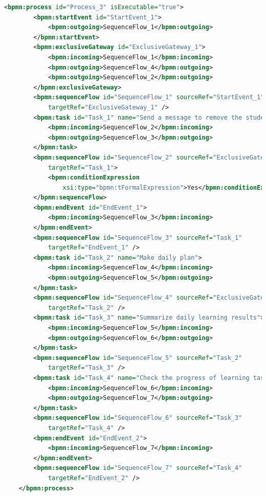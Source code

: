 \documentclass[runningheads]{llncs}
\begin{document}
	\begin{lstlisting}[language={XML}]
	<bpmn:process id="Process_3" isExecutable="true">
		<bpmn:startEvent id="StartEvent_1">
	        <bpmn:outgoing>SequenceFlow_1</bpmn:outgoing>
	    </bpmn:startEvent>
		<bpmn:exclusiveGateway id="ExclusiveGateway_1">
			<bpmn:incoming>SequenceFlow_1</bpmn:incoming>
			<bpmn:outgoing>SequenceFlow_4</bpmn:outgoing>
			<bpmn:outgoing>SequenceFlow_2</bpmn:outgoing>
		</bpmn:exclusiveGateway>
		<bpmn:sequenceFlow id="SequenceFlow_1" sourceRef="StartEvent_1"
	        targetRef="ExclusiveGateway_1" />
		<bpmn:task id="Task_1" name="Send a message to remove the student from the self-study room">
	        <bpmn:incoming>SequenceFlow_2</bpmn:incoming>
	        <bpmn:outgoing>SequenceFlow_3</bpmn:outgoing>
	    </bpmn:task>
		<bpmn:sequenceFlow id="SequenceFlow_2" sourceRef="ExclusiveGateway_1"
			targetRef="Task_1">
			<bpmn:conditionExpression
				xsi:type="bpmn:tFormalExpression">Yes</bpmn:conditionExpression>
		</bpmn:sequenceFlow>
		<bpmn:endEvent id="EndEvent_1">
			<bpmn:incoming>SequenceFlow_3</bpmn:incoming>
		</bpmn:endEvent>
		<bpmn:sequenceFlow id="SequenceFlow_3" sourceRef="Task_1"
	        targetRef="EndEvent_1" />
		<bpmn:task id="Task_2" name="Make daily plan">
	        <bpmn:incoming>SequenceFlow_4</bpmn:incoming>
	        <bpmn:outgoing>SequenceFlow_5</bpmn:outgoing>
	    </bpmn:task>	
		<bpmn:sequenceFlow id="SequenceFlow_4" sourceRef="ExclusiveGateway_1"
	        targetRef="Task_2" />
		<bpmn:task id="Task_3" name="Summarize daily learning results">
	        <bpmn:incoming>SequenceFlow_5</bpmn:incoming>
	        <bpmn:outgoing>SequenceFlow_6</bpmn:outgoing>
	    </bpmn:task>	
		<bpmn:sequenceFlow id="SequenceFlow_5" sourceRef="Task_2"
	        targetRef="Task_3" />
		<bpmn:task id="Task_4" name="Check the progress of learning task">
	        <bpmn:incoming>SequenceFlow_6</bpmn:incoming>
	        <bpmn:outgoing>SequenceFlow_7</bpmn:outgoing>
	    </bpmn:task>	
		<bpmn:sequenceFlow id="SequenceFlow_6" sourceRef="Task_3"
	        targetRef="Task_4" />
		<bpmn:endEvent id="EndEvent_2">
			<bpmn:incoming>SequenceFlow_7</bpmn:incoming>
		</bpmn:endEvent>
		<bpmn:sequenceFlow id="SequenceFlow_7" sourceRef="Task_4"
	        targetRef="EndEvent_2" />
	</bpmn:process>

	\end{lstlisting}
	
	\clearpage
\end{document}
